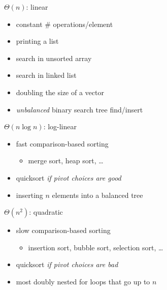 \begin{frame}{$\Theta(n)$: linear}
    \begin{itemize}
        \item constant \# operations/element
            \vspace{.5cm}
        \item printing a list
        \item search in unsorted array
        \item search in linked list
        \item doubling the size of a vector
        \item \textit{unbalanced} binary search tree find/insert
    \end{itemize}
\end{frame}

\begin{frame}{$\Theta(n \log n)$: log-linear}
    \begin{itemize}
        \item fast comparison-based sorting 
            \begin{itemize}
            \item merge sort, heap sort, \ldots
            \end{itemize}
        \item quicksort \textit{if pivot choices are good}
        \item inserting $n$ elements into a balanced tree
    \end{itemize}
\end{frame}

\begin{frame}{$\Theta(n^2)$: quadratic}
    \begin{itemize}
        \item slow comparison-based sorting
            \begin{itemize}
            \item insertion sort, bubble sort, selection sort, \ldots
            \end{itemize}
        \item quicksort \textit{if pivot choices are bad}
        \item most doubly nested for loops that go up to $n$
    \end{itemize}
\end{frame}

